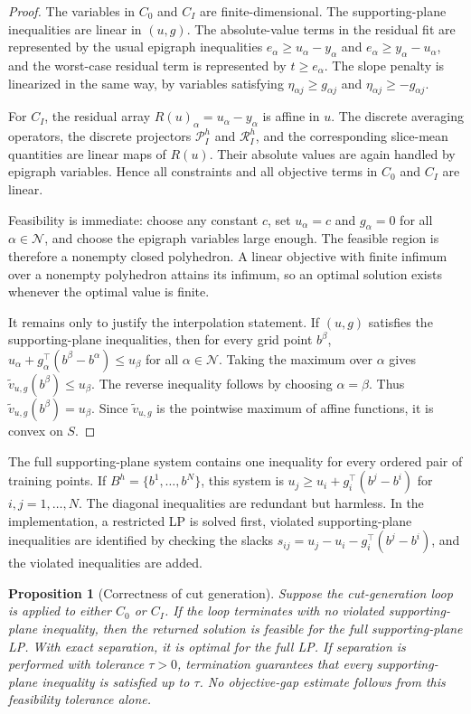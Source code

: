 \documentclass[11pt,letterpaper]{article}
\newtheorem{proposition}[theorem]{Proposition}
\theoremstyle{definition}
\theoremstyle{remark}
\begin{document}
\begin{proof}
The variables in $C_0$ and $C_I$ are finite-dimensional. The
supporting-plane inequalities are linear in $(u,g)$. The absolute-value terms
in the residual fit are represented by the usual epigraph inequalities
$e_\alpha\ge u_\alpha-y_\alpha$ and $e_\alpha\ge y_\alpha-u_\alpha$, and the
worst-case residual term is represented by $t\ge e_\alpha$. The slope penalty
is linearized in the same way, by variables satisfying
$\eta_{\alpha j}\ge g_{\alpha j}$ and
$\eta_{\alpha j}\ge -g_{\alpha j}$.

For $C_I$, the residual array $R(u)_\alpha=u_\alpha-y_\alpha$ is affine in
$u$. The discrete averaging operators, the discrete projectors
$\mathcal P_I^h$ and $\mathcal R_I^h$, and the corresponding slice-mean
quantities are linear maps of $R(u)$. Their absolute values are again handled
by epigraph variables. Hence all constraints and all objective terms in
$C_0$ and $C_I$ are linear.

Feasibility is immediate: choose any constant $c$, set $u_\alpha=c$ and
$g_\alpha=0$ for all $\alpha\in\mathcal N$, and choose the epigraph variables
large enough. The feasible region is therefore a nonempty closed polyhedron.
A linear objective with finite infimum over a nonempty polyhedron attains its
infimum, so an optimal solution exists whenever the optimal value is finite.

It remains only to justify the interpolation statement. If $(u,g)$ satisfies
the supporting-plane inequalities, then for every grid point $b^\beta$,
$
u_\alpha+g_\alpha^\top(b^\beta-b^\alpha)\le u_\beta
$
for all $\alpha\in\mathcal N$. Taking the maximum over $\alpha$ gives
$\widetilde v_{u,g}(b^\beta)\le u_\beta$. The reverse inequality follows by
choosing $\alpha=\beta$. Thus $\widetilde v_{u,g}(b^\beta)=u_\beta$. Since
$\widetilde v_{u,g}$ is the pointwise maximum of affine functions, it is convex
on $S$.
\end{proof}

The full supporting-plane system contains one inequality for every ordered pair
of training points. If $B^h=\{b^1,\ldots,b^N\}$, this system is
$u_j\ge u_i+g_i^\top(b^j-b^i)$ for $i,j=1,\ldots,N$. The diagonal inequalities
are redundant but harmless. In the implementation, a restricted LP is solved
first, violated supporting-plane inequalities are identified by checking the
slacks $s_{ij}=u_j-u_i-g_i^\top(b^j-b^i)$, and the violated inequalities are
added.

\begin{proposition}[Correctness of cut generation]
\label{prop:cut_generation_correctness}
Suppose the cut-generation loop is applied to either $C_0$ or $C_I$. If the
loop terminates with no violated supporting-plane inequality, then the returned
solution is feasible for the full supporting-plane LP. With exact separation,
it is optimal for the full LP. If separation is performed with tolerance $\tau>0$, termination guarantees
that every supporting-plane inequality is satisfied up to $\tau$. No
objective-gap estimate follows from this feasibility tolerance alone.
\end{proposition}
\end{document}
